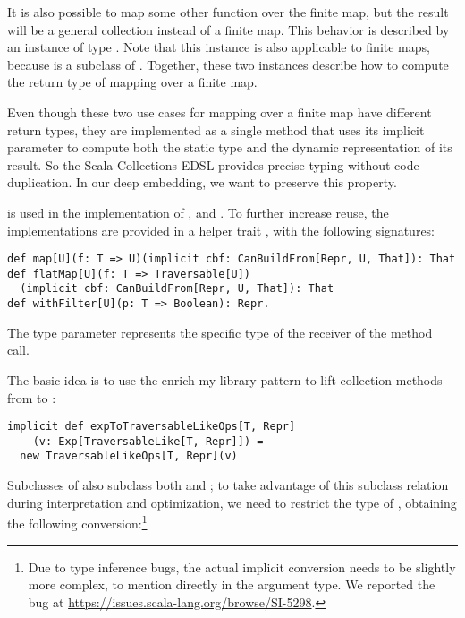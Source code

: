 It is also possible to map some other function over the finite map, but the result will be a general collection instead of a finite map. This behavior is described by an instance of type \code{CanBuildFrom[Traversable[T], U, Traversable[U]}. Note that this instance is also applicable to finite maps, because  is a subclass of . Together, these two instances describe how to compute the return type of mapping over a finite map.

Even though these two use cases for mapping over a finite map have different return types, they are implemented as a single method that uses its implicit  parameter to compute both the static type and the dynamic representation of its result. So the Scala Collections EDSL provides precise typing without code duplication. In our deep embedding, we want to preserve this property.

 is used in the implementation of ,  and . To further increase reuse, the implementations are provided in a helper trait , with the following signatures:

\begin{lstlisting}
def map[U](f: T => U)(implicit cbf: CanBuildFrom[Repr, U, That]): That
def flatMap[U](f: T => Traversable[U])
  (implicit cbf: CanBuildFrom[Repr, U, That]): That
def withFilter[U](p: T => Boolean): Repr.
\end{lstlisting}

The  type parameter represents the specific type of the receiver of the method call.

The basic idea is to use the enrich-my-library pattern to lift collection methods from  to :
\begin{lstlisting}
implicit def expToTraversableLikeOps[T, Repr]
    (v: Exp[TraversableLike[T, Repr]]) =
  new TraversableLikeOps[T, Repr](v)
\end{lstlisting}

Subclasses of  also subclass both  and ; to take advantage of this subclass relation during interpretation and optimization, we need to restrict the type of , obtaining the following conversion:\footnote{Due to type inference bugs, the actual implicit conversion needs to be slightly more complex, to mention  directly in the argument type. We reported the bug at \url{https://issues.scala-lang.org/browse/SI-5298}.}

